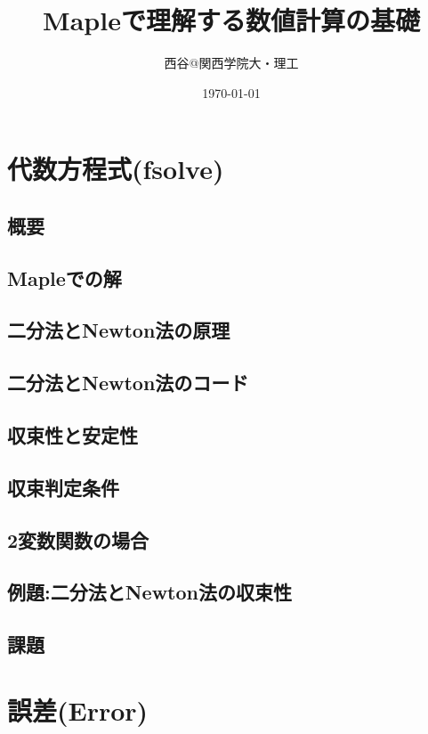 \documentclass[10pt,a4j]{jsbook}
\begin{document}
\title{Mapleで理解する数値計算の基礎}
\author{西谷@関西学院大・理工}
\date{\today}
\maketitle
\tableofcontents

%
\chapter{代数方程式(fsolve)}
\section{概要}
 
\section{Mapleでの解}
 
\section{二分法とNewton法の原理}
 
\section{二分法とNewton法のコード}
 
\section{収束性と安定性}
 
\section{収束判定条件}
 
\section{2変数関数の場合}
 
\section{例題:二分法とNewton法の収束性}
 
\section{課題}
 

\chapter{誤差(Error)}
\end{document}
